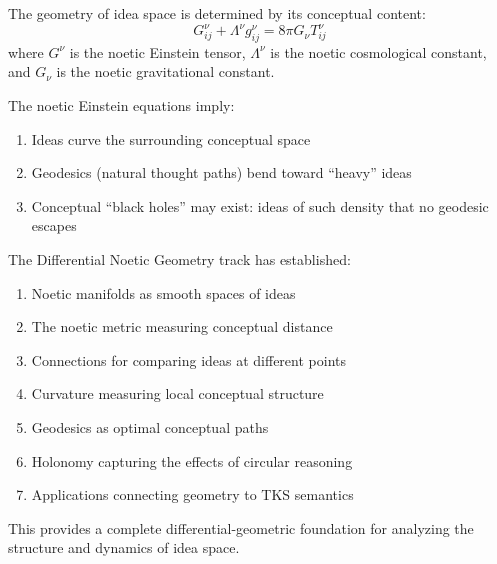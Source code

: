 \begin{axiom}
\label{axiom:noetic-einstein}
The geometry of idea space is determined by its conceptual content:
\[
    G^\nu_{ij} + \Lambda^\nu g^\nu_{ij} = 8\pi G_\nu T^\nu_{ij}
\]
where $G^\nu$ is the noetic Einstein tensor, $\Lambda^\nu$ is the noetic
cosmological constant, and $G_\nu$ is the noetic gravitational constant.
\end{axiom}

\begin{theorem}
\label{thm:conceptual-dynamics}
The noetic Einstein equations imply:
\begin{enumerate}[label=(\roman*)]
    \item Ideas curve the surrounding conceptual space
    \item Geodesics (natural thought paths) bend toward ``heavy'' ideas
    \item Conceptual ``black holes'' may exist: ideas of such density that
          no geodesic escapes
\end{enumerate}
\end{theorem}


\begin{tcolorbox}[colback=blue!5!white,colframe=blue!75!black,title=Track Summary,breakable]
The Differential Noetic Geometry track has established:
\begin{enumerate}
    \item Noetic manifolds as smooth spaces of ideas
    \item The noetic metric measuring conceptual distance
    \item Connections for comparing ideas at different points
    \item Curvature measuring local conceptual structure
    \item Geodesics as optimal conceptual paths
    \item Holonomy capturing the effects of circular reasoning
    \item Applications connecting geometry to TKS semantics
\end{enumerate}
This provides a complete differential-geometric foundation for
analyzing the structure and dynamics of idea space.
\end{tcolorbox}
